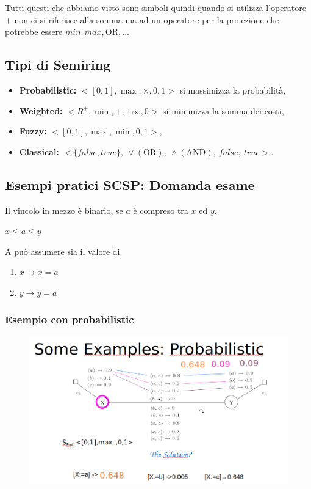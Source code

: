 Tutti questi che abbiamo visto sono simboli quindi quando si utilizza
l'operatore $+$ non ci si riferisce alla somma ma ad un operatore per la
proiezione che potrebbe essere $min, max, \text{OR}, \ldots$

\subsection{Tipi di Semiring}
\begin{itemize}
    \item \textbf{Probabilistic:} $<[0, 1], \max, \times, 0, 1>$ si massimizza
          la probabilità,
    \item \textbf{Weighted:} $<R^+, \min, +, +\infty, 0>$ si minimizza la somma
          dei costi,
    \item \textbf{Fuzzy:} $<[0,1], \max, \min, 0, 1>$,
    \item \textbf{Classical:} $<\{false,true\}, \ \lor(\text{OR}), \
              \land(\text{AND}), \ false, \ true>$.
\end{itemize}

\subsection{Esempi pratici SCSP: Domanda esame}
Il vincolo in mezzo è binario, se $a$ è compreso tra $x$ ed $y$.
\begin{center}
    $x \leq a \leq y$
\end{center}
A può assumere sia il valore di
\begin{enumerate}
    \item $x \rightarrow x = a$
    \item $y \rightarrow y = a$
\end{enumerate}

\subsubsection{Esempio con probabilistic}

\begin{figure}[H]
    \centering
    \includegraphics[width=12.5cm, keepaspectratio]{img/Cap4/probabilistic2.png}
\end{figure}

